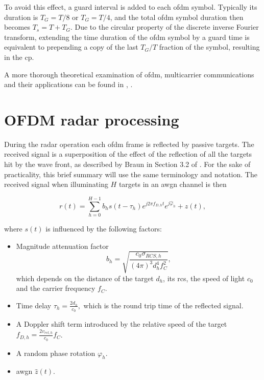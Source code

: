 To avoid this effect, a guard interval is added to each \gls{ofdm} symbol. Typically its duration is $T_G = T/8$ or $T_G = T/4$, and the total \gls{ofdm} symbol duration then becomes $T_s = T + T_G$.
Due to the circular property of the discrete inverse Fourier transform, extending the time duration of the \gls{ofdm} symbol by a guard time is equivalent to prepending a copy of the last $T_G/T$ fraction of the symbol, resulting in the \gls{cp}.


A more thorough theoretical examination of \gls{ofdm}, multicarrier communications and their applications can be found in \cite{OFDMWireless}, \cite{Proakis_2001}.


\section{OFDM radar processing}
        
    During the radar operation each \gls{ofdm} frame is reflected by passive targets. The received signal is a superposition of the effect of the reflection of all the targets hit by the wave front, as described by Braun in Section 3.2 of \cite{Braun2014OFDMRA}. For the sake of practicality, this brief summary will use the same terminology and notation.
    The received signal when illuminating $H$ targets in an \gls{awgn} channel is then
    
    \begin{equation}
    \label{eq:received_signal_mltiple_targets}
        r(t) = \sum_{h=0}^{H-1} b_h s(t-\tau_h)e^{j2\pi f_{D,h}t}e^{j\hat{\varphi}_h} + z(t),
    \end{equation}
    
    where $s(t)$ is influenced by the following factors:
    
    \begin{itemize}
        \item Magnitude attenuation factor $$b_h = \sqrt{\frac{c_0\sigma_{RCS,h}}{(4\pi)^3 d_h^4f_C^2}},$$
    which depends on the distance of the target $d_h$, its \gls{rcs}, the speed of light $c_0$ and the carrier frequency $f_C$.
    
        \item Time delay $\tau_h = \frac{2d_h}{c_0},$ which is the round trip time of the reflected signal.
    
        \item A Doppler shift term introduced by the relative speed of the target $f_{D,h} = \frac{2v_{rel,h}}{c_0}f_C$.
        \item A random phase rotation $\varphi_h$.
        \item \gls{awgn} $\hat{z}(t)$.
    \end{itemize}
    
